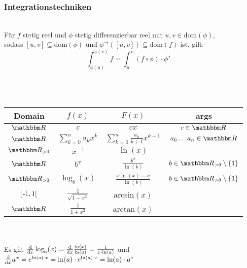 \subsubsection*{Integrationstechniken}
\textsc{}\\
    Für \(f\) stetig reel und \(\phi\) stetig differenzierbar reel mit \(u,v \in \text{dom}(\phi)\),\\
    sodass \([u,v] \subseteq \text{dom}(\phi)\) und \(\phi^\rightarrow([u,v]) \subseteq \text{dom}(f)\) ist, gilt:
    \[\int_{\phi(u)}^{\phi(v)}f = \int_{u}^{v}(f \circ \phi) \cdot \phi'\] \\
 \\ \\
\begin{tabular}{ c | c | c | c }
    \hline
    Domain & \(f(x)\) & \(F(x)\) & args \\
    \hline
    \(\R\) & \(c\) & \(cx\) & \(c \in \R\) \\
    \(\R\) & \(\sum_{k=0}^{n}a_kx^k\) & \(\sum_{k=0}^{n}\frac{a_k}{k+1}x^{k+1}\) & \(a_0 \dots a_n \in \R\) \\
    \(\R_{> 0}\) & \(x^{-1}\) & \(\ln(x)\) & \\
    \(\R\) & \(b^x\) & \(\frac{b^x}{\ln(b)}\) & \(b \in \R_{>0} \setminus \{1\}\) \\
    \(\R_{> 0}\) & \(\log_b(x)\) & \(\frac{x\ln(x) - x}{\ln(b)}\) & \(b \in \R_{>0} \setminus \{1\}\) \\
    \(]\text{-} 1, 1[\) & \(\frac{1}{\sqrt{1-x^2}}\) & arcsin\((x)\) & \\
    \(\R\) & \(\frac{1}{1+x^2}\) & arctan\((x)\) & 
\end{tabular} \\
\textsc{} \\
    Es gilt \(\frac{\text d}{\text dx}\log_a(x) = \frac{\text d}{\text dx}\frac{\ln(x)}{\ln(a)} = \frac{1}{x \cdot \ln(a)}\) und \(\frac{\text d}{\text dx} a^x = e^{\ln(a) \cdot x} = \ln(a) \cdot e^{\ln(a) \cdot x} = \ln(a) \cdot a^x\)
